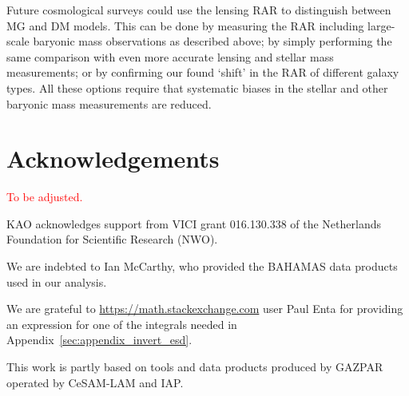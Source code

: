 \documentclass[usenatbib]{mnras}
\newcommand{\un}[1]{_{\rm #1}}
\begin{document}
Future cosmological surveys could use the lensing RAR to distinguish between MG and DM models. This can be done by measuring the RAR including large-scale baryonic mass observations as described above; by simply performing the same comparison with even more accurate lensing and stellar mass measurements; or by confirming our found `shift' in the RAR of different galaxy types. All these options require that systematic biases in the stellar and other baryonic mass measurements are reduced.




\section*{Acknowledgements}
\textcolor{red}{To be adjusted.}

KAO acknowledges support from VICI grant 016.130.338 of the Netherlands Foundation for Scientific Research (NWO).

We are indebted to Ian McCarthy, who provided the BAHAMAS data products used in our analysis.

We are grateful to \url{https://math.stackexchange.com} user Paul Enta for providing an expression for one of the integrals needed in Appendix~\ref{sec:appendix_invert_esd}.

This work is partly based on tools and data products produced by GAZPAR operated by CeSAM-LAM and IAP.

\end{document}
